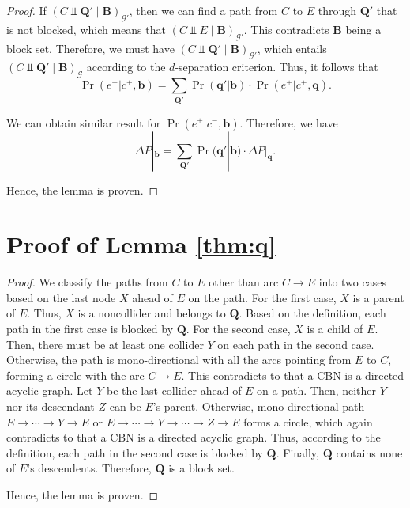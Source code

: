 \documentclass[twoside,leqno,twocolumn]{article}
\begin{document}
\begin{proof}
If $(C \Perp \mathbf{Q'} \mid \mathbf{B})_{\mathcal{G}'}$, then we can find a path from $C$ to $E$ through $\mathbf{Q}'$ that is not blocked, which means that $(C \Perp E \mid \mathbf{B})_{\mathcal{G}'}$. This contradicts $\mathbf{B}$ being a block set. Therefore, we must have $(C \Perp \mathbf{Q'} \mid \mathbf{B})_{\mathcal{G}'}$, which entails $(C \Perp \mathbf{Q'} \mid \mathbf{B})_{\mathcal{G}}$ according to the $d$-separation criterion. Thus, it follows that
\begin{equation*}
\Pr(e^{+}|c^{+},\mathbf{b}) = \sum_{\mathbf{Q'}}\Pr(\mathbf{q'}|\mathbf{b})\cdot \Pr(e^{+}|c^{+},\mathbf{q}).
\end{equation*}

We can obtain similar result for $\Pr(e^{+}|c^{-},\mathbf{b})$. Therefore, we have
\begin{equation}\label{eq:qd3}
\Delta P|_{\mathbf{b}}=\sum_{\mathbf{Q'}}\Pr(\mathbf{q'}|\mathbf{b})\cdot \Delta P|_{\mathbf{q}}.
\end{equation}

Hence, the lemma is proven.
\end{proof}

\section{Proof of Lemma \ref{thm:q}}\label{sec:thm:q}
\begin{proof}
We classify the paths from $C$ to $E$ other than arc $C \rightarrow E$ into two cases based on the last node $X$ ahead of $E$ on the path. For the first case, $X$ is a parent of $E$. Thus, $X$ is a noncollider and belongs to $\mathbf{Q}$. Based on the definition, each path in the first case is blocked by $\mathbf{Q}$. For the second case, $X$ is a child of $E$. Then, there must be at least one collider $Y$ on each path in the second case. Otherwise, the path is mono-directional with all the arcs pointing from $E$ to $C$, forming a circle with the arc $C \rightarrow E$. This contradicts to that a CBN is a directed acyclic graph. Let $Y$ be the last collider ahead of $E$ on a path. Then, neither $Y$ nor its descendant $Z$ can be $E$'s parent. Otherwise, mono-directional path $E \rightarrow \cdots \rightarrow Y \rightarrow E$ or $E \rightarrow \cdots \rightarrow Y \rightarrow \cdots \rightarrow Z \rightarrow E$ forms a circle, which again contradicts to that a CBN is a directed acyclic graph. Thus, according to the definition, each path in the second case is blocked by $\mathbf{Q}$. Finally, $\mathbf{Q}$ contains none of $E$'s descendents. Therefore, $\mathbf{Q}$ is a block set.

Hence, the lemma is proven.
\end{proof}
\end{document}
